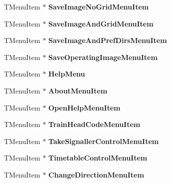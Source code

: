 \begin{DoxyCompactItemize}
T\+Menu\+Item $\ast$ {\bfseries Save\+Image\+No\+Grid\+Menu\+Item}
\item 
\mbox{\label{class_t_interface_aef6c1bcfb0fdba0e490b2f60cc39a1b5}} 
T\+Menu\+Item $\ast$ {\bfseries Save\+Image\+And\+Grid\+Menu\+Item}
\item 
\mbox{\label{class_t_interface_ad02063279ff7f65971612a10a6852f38}} 
T\+Menu\+Item $\ast$ {\bfseries Save\+Image\+And\+Pref\+Dirs\+Menu\+Item}
\item 
\mbox{\label{class_t_interface_a55fa81c120a7b449b927e9243cf13261}} 
T\+Menu\+Item $\ast$ {\bfseries Save\+Operating\+Image\+Menu\+Item}
\item 
\mbox{\label{class_t_interface_a9754392369386385a52c45747774c408}} 
T\+Menu\+Item $\ast$ {\bfseries Help\+Menu}
\item 
\mbox{\label{class_t_interface_a8b725a9474aad77174fdf8e44b285b98}} 
T\+Menu\+Item $\ast$ {\bfseries About\+Menu\+Item}
\item 
\mbox{\label{class_t_interface_a6cdce7bb8a495891ca9aebdec811eea7}} 
T\+Menu\+Item $\ast$ {\bfseries Open\+Help\+Menu\+Item}
\item 
\mbox{\label{class_t_interface_a4f47c7fbc5c7fed553660681e9a9db13}} 
T\+Menu\+Item $\ast$ {\bfseries Train\+Head\+Code\+Menu\+Item}
\item 
\mbox{\label{class_t_interface_aba33f688c4d29b90e6199ebbc3ec915a}} 
T\+Menu\+Item $\ast$ {\bfseries Take\+Signaller\+Control\+Menu\+Item}
\item 
\mbox{\label{class_t_interface_a98a1985536936cdcc54066e7c9c51752}} 
T\+Menu\+Item $\ast$ {\bfseries Timetable\+Control\+Menu\+Item}
\item 
\mbox{\label{class_t_interface_a33602d7a6ab6abd00ef298f9e43c7ed1}} 
T\+Menu\+Item $\ast$ {\bfseries Change\+Direction\+Menu\+Item}
\item 
\mbox{\label{class_t_interface_aec930273d5d2aef93eda66a890856846}} 

\end{DoxyCompactItemize}
